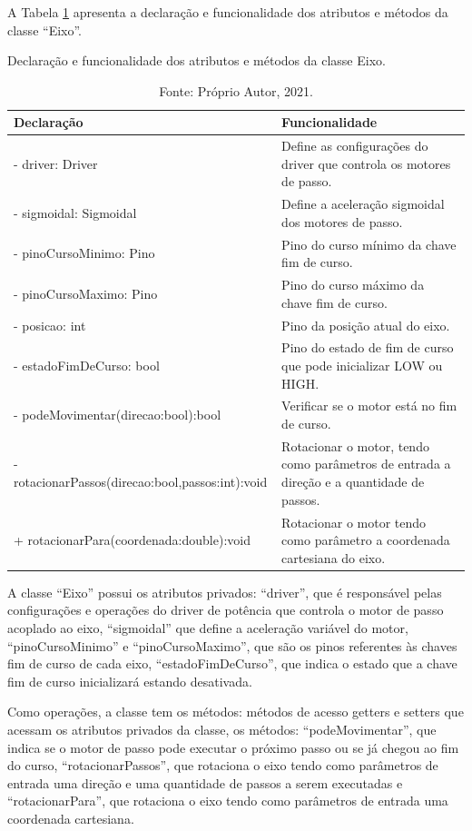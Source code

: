 A Tabela \ref{tab:classeeixo} apresenta a declaração e funcionalidade dos atributos e métodos da 
classe “Eixo”.

\begin{table}[H]
    \footnotesize
    \centering
    \caption{Declaração e funcionalidade dos atributos e métodos da classe Eixo.}
    \begin{tabular}{lp{6cm}}
        \hline
        \textbf{Declaração} & \textbf{Funcionalidade}\\
        \hline
        - driver: Driver & Define as configurações do driver que controla os motores de passo.\\
        - sigmoidal: Sigmoidal & Define a aceleração sigmoidal dos motores de passo.\\
        - pinoCursoMinimo: Pino & Pino do curso mínimo da chave fim de curso.\\
        - pinoCursoMaximo: Pino & Pino do curso máximo da chave fim de curso.\\
        - posicao: int & Pino da posição atual do eixo.\\
        - estadoFimDeCurso: bool & Pino do estado de fim de curso que pode inicializar LOW ou HIGH.\\
        - podeMovimentar(direcao:bool):bool & Verificar se o motor está no fim de curso.\\
        - rotacionarPassos(direcao:bool,passos:int):void & Rotacionar o motor, tendo como parâmetros de entrada a direção e a quantidade de passos.\\
        + rotacionarPara(coordenada:double):void & Rotacionar o motor tendo como parâmetro a coordenada cartesiana do eixo.\\
        \hline       
    \end{tabular}
    \caption*{Fonte: Próprio Autor, 2021.}
    \label{tab:classeeixo}
\end{table}

A classe “Eixo” possui os atributos privados: “driver”, que é responsável pelas configurações e operações 
do driver de potência que controla o motor de passo acoplado ao eixo, “sigmoidal” que define a aceleração 
variável do motor, “pinoCursoMinimo” e “pinoCursoMaximo”, que são os pinos referentes às chaves fim de 
curso de cada eixo, “estadoFimDeCurso”, que indica o estado que a chave fim de curso inicializará estando 
desativada. 

Como operações, a classe tem os métodos: métodos de acesso getters e setters que acessam os atributos 
privados da classe, os métodos: “podeMovimentar”, que indica se o motor de passo pode executar o próximo 
passo ou se já chegou ao fim do curso, “rotacionarPassos”, que rotaciona o eixo tendo como parâmetros de 
entrada uma direção e uma quantidade de passos a serem executadas e “rotacionarPara”, que rotaciona o 
eixo tendo como parâmetros de entrada uma coordenada cartesiana.

